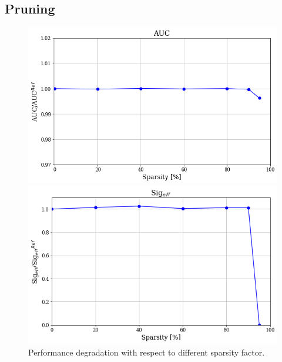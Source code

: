 \documentclass[../../main.tex]{subfiles}
\begin{document}
 
\subsection{Pruning}
\label{sec:P2GT_Prune}

\begin{figure}[h] 
  \label{ fig7} 
  \begin{minipage}[b]{0.5\linewidth}
    \centering
    \includegraphics[width=.95\linewidth]{sections/05/Images/Prune_AUC_1ele.png} 
    \vspace{4ex}
  \end{minipage}%
  \begin{minipage}[b]{0.5\linewidth}
    \centering
    \includegraphics[width=.95\linewidth]{sections/05/Images/Prune_SigEff_1ele.png}
    \vspace{4ex}
  \end{minipage}
  \caption{Performance degradation with respect to different sparsity factor.} 
  \label{fig:Prune_plots}
\end{figure}
\end{document}
